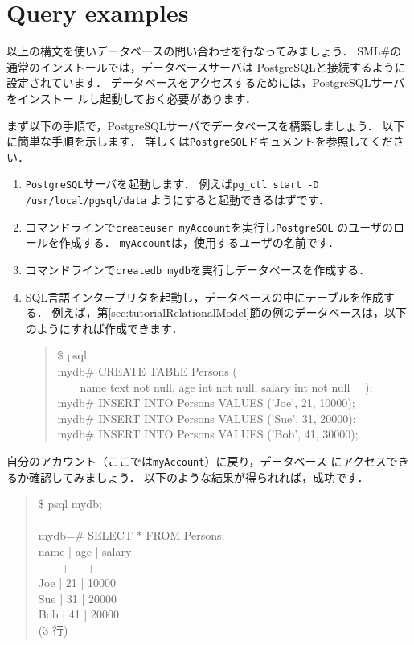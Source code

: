 \documentclass{jbook}
\newcommand{\txt}[2]{#2}
\newcommand{\smlsharp}{SML\#}
\newcommand{\myem}{\mbox{\ \ }}
\newenvironment{program}{\begin{quote}\begin{tt}}%
                        {\end{tt}\end{quote}}
\begin{document}
\section{\txt{データベース問い合わせ実行例}{Query examples}}
\label{sec:tutorialSQLExample}

\ifjp%
	以上の構文を使いデータベースの問い合わせを行なってみましょう．
	\smlsharp{}の通常のインストールでは，データベースサーバは
PostgreSQLと接続するように設定されています．
	データベースをアクセスするためには，PostgreSQLサーバをインストー
ルし起動しておく必要があります． 
	
	まず以下の手順で，PostgreSQLサーバでデータベースを構築しましょう．
	以下に簡単な手順を示します．
	詳しくは{\tt PostgreSQL}ドキュメントを参照してください．
\begin{enumerate}
\item {\tt PostgreSQL}サーバを起動します．
	例えば{\tt pg\_ctl start -D /usr/local/pgsql/data}
ようにすると起動できるはずです．
\item コマンドラインで{\tt createuser myAccount}を実行し{\tt PostgreSQL}
のユーザのロールを作成する．
	{\tt myAccount}は，使用するユーザの名前です．
\item 
コマンドラインで{\tt createdb mydb}を実行しデータベースを作成する．
\begin{quote}

\end{quote}
\item SQL言語インタープリタを起動し，データベースの中にテーブルを作成す
る．
	例えば，第\ref{sec:tutorialRelationalModel}節の例のデータベースは，以下
のようにすれば作成できます．
\begin{program}
\$ psql\\
mydb\# CREATE TABLE Persons (\\
\myem\myem name text not null, age int not null, salary int not null
\myem );\\
mydb\# INSERT INTO Persons VALUES ('Joe', 21, 10000);\\
mydb\# INSERT INTO Persons VALUES ('Sue', 31, 20000);\\
mydb\# INSERT INTO Persons VALUES ('Bob', 41, 30000);\\
\end{program}
\end{enumerate}
	自分のアカウント（ここでは{\tt myAccount}）に戻り，データベース
にアクセスできるか確認してみましょう．
	以下のような結果が得られれば，成功です．
\begin{program}
\$ psql mydb;\\
\\
mydb=\# SELECT * FROM Persons;\\
 name | age | salary \\
------+-----+--------\\
 Joe  |  21 |  10000\\
 Sue  |  31 |  20000\\
 Bob  |  41 |  20000\\
(3 行)
\end{program}
\end{document}
